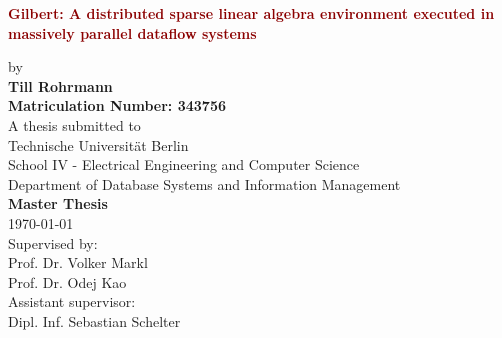 \begin{titlepage}
	\strut
	\hfill
	\begin{center}
	\vspace{1cm}
	\Huge
	\begin{spacing}{.9}
		\textcolor{DarkRed}{\textbf{Gilbert: A distributed sparse linear algebra environment executed in massively parallel dataflow systems}}\\
	\end{spacing}
	\vspace{0.8cm}
	\large
	by\\
	\vspace{0.8cm} 
	\textbf{Till Rohrmann}\\
	\vspace{0.8cm} 
	\textbf{Matriculation Number: 343756}\\
	\vspace{2cm} 
 	A thesis submitted to\\
	\vspace{0.5cm}
	Technische Universität Berlin\\
	School IV - Electrical Engineering and Computer Science\\
	Department of Database Systems and Information Management\\
	\vspace{0.5cm}
	\textbf{Master Thesis}\\
	\vspace{2.2cm}
	\today\\
	\vspace{2.0cm}
	\large
	Supervised by:\\
	Prof. Dr. Volker Markl\\
	Prof. Dr. Odej Kao\\
	\vspace{1cm}
	Assistant supervisor:\\
	Dipl. Inf. Sebastian Schelter
	\end{center}
\end{titlepage}